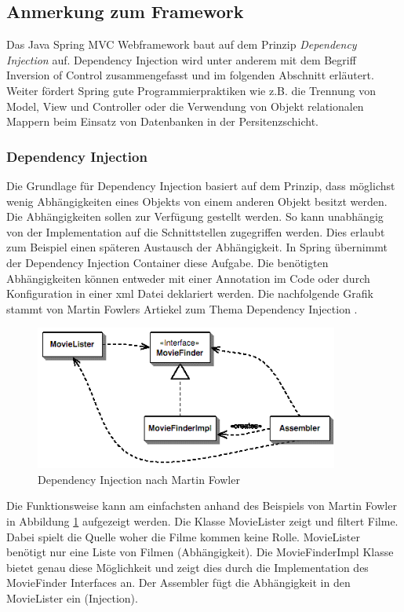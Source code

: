 \subsection{Anmerkung zum Framework}
Das Java Spring MVC Webframework baut auf dem Prinzip \textit{Dependency Injection} auf. Dependency Injection wird unter anderem mit dem Begriff Inversion of Control zusammengefasst und im folgenden Abschnitt erläutert. Weiter fördert Spring gute Programmierpraktiken wie z.B. die Trennung von Model, View und Controller oder die Verwendung von Objekt relationalen Mappern beim Einsatz von Datenbanken in der Persitenzschicht.

\subsubsection{Dependency Injection}
Die Grundlage für Dependency Injection basiert auf dem Prinzip, dass möglichst wenig Abhängigkeiten eines Objekts von einem anderen Objekt besitzt werden. Die Abhängigkeiten sollen zur Verfügung gestellt werden. So kann unabhängig von der Implementation auf die Schnittstellen zugegriffen werden. Dies erlaubt zum Beispiel einen späteren Austausch der Abhängigkeit. In Spring übernimmt der Dependency Injection Container diese Aufgabe. Die benötigten Abhängigkeiten können entweder mit einer Annotation im Code oder durch Konfiguration in einer xml Datei deklariert werden. Die nachfolgende Grafik stammt von Martin Fowlers Artiekel zum Thema Dependency Injection \cite{martinfowler2004}.
\begin{figure}[H]
	\centering
	\includegraphics[width=100mm]{images/tourliveweb/dependencyinjection.png}
	\caption{Dependency Injection nach Martin Fowler \cite{martinfowler2004}}
	\label{fig:dpendencyinjection}
\end{figure}
Die Funktionsweise kann am einfachsten anhand des Beispiels von Martin Fowler in Abbildung \ref{fig:dpendencyinjection} aufgezeigt werden. Die Klasse MovieLister zeigt und filtert Filme. Dabei spielt die Quelle woher die Filme kommen keine Rolle. MovieLister benötigt nur eine Liste von Filmen (Abhängigkeit). Die MovieFinderImpl Klasse bietet genau diese Möglichkeit und zeigt dies durch die Implementation des MovieFinder Interfaces an. Der Assembler fügt die Abhängigkeit in den MovieLister ein (Injection).
\\

